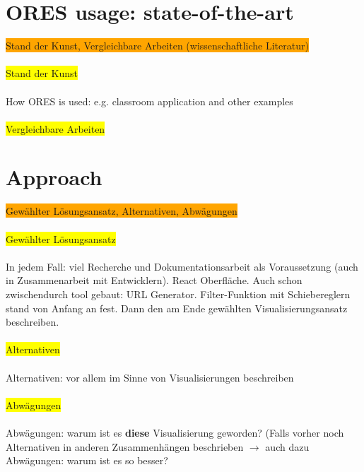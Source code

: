 \documentclass[12pt,a4paper]{article}
\begin{document}
\section{ORES usage: state-of-the-art}
\colorbox{orange}{Stand der Kunst, Vergleichbare Arbeiten (wissenschaftliche Literatur)}
\\
\\
\colorbox{yellow}{Stand der Kunst}
\\
\\
How ORES is used: e.g. classroom application and other examples
\\
\\
\colorbox{yellow}{Vergleichbare Arbeiten}
%
%
%
\section{Approach}
\colorbox{orange}{Gewählter Lösungsansatz, Alternativen, Abwägungen}
\\
\\
\colorbox{yellow}{Gewählter Lösungsansatz}
\\
\\
In jedem Fall: viel Recherche und Dokumentationsarbeit als Voraussetzung (auch in Zusammenarbeit mit Entwicklern). React Oberfläche. Auch schon zwischendurch tool gebaut: URL Generator. Filter-Funktion mit Schiebereglern stand von Anfang an fest. Dann den am Ende gewählten Visualisierungsansatz beschreiben.
\\
\\
\colorbox{yellow}{Alternativen}
\\
\\
Alternativen: vor allem im Sinne von Visualisierungen beschreiben
\\
\\
\colorbox{yellow}{Abwägungen}
\\
\\
Abwägungen: warum ist es \textbf{diese} Visualisierung geworden? (Falls vorher noch Alternativen in anderen Zusammenhängen beschrieben $\rightarrow$ auch dazu Abwägungen: warum ist es so besser?
\\
\\
\end{document}
